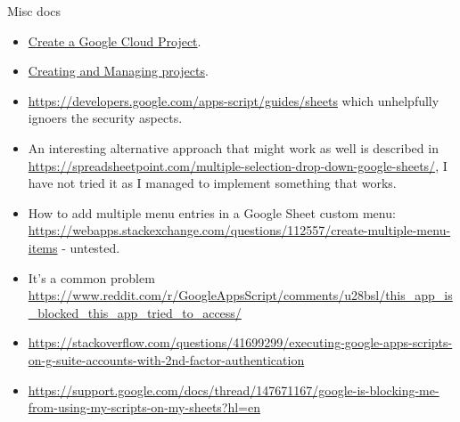 Misc docs
\begin{itemize}
    \item \href{https://developers.google.com/workspace/guides/create-project}{Create a Google Cloud Project}.
    \item \href{https://cloud.google.com/resource-manager/docs/creating-managing-projects}{Creating and Managing projects}.
    \item \url{https://developers.google.com/apps-script/guides/sheets} which unhelpfully ignoers the security aspects.
    \item An interesting alternative approach that might work as well is described in \url{https://spreadsheetpoint.com/multiple-selection-drop-down-google-sheets/}, I have not tried it as I managed to implement something that works.
    \item How to add multiple menu entries in a Google Sheet custom menu: \url{https://webapps.stackexchange.com/questions/112557/create-multiple-menu-items} - untested.
    \item It's a common problem \url{https://www.reddit.com/r/GoogleAppsScript/comments/u28bsl/this_app_is_blocked_this_app_tried_to_access/}
    \item \url{https://stackoverflow.com/questions/41699299/executing-google-apps-scripts-on-g-suite-accounts-with-2nd-factor-authentication}
    \item \url{https://support.google.com/docs/thread/147671167/google-is-blocking-me-from-using-my-scripts-on-my-sheets?hl=en}
\end{itemize}